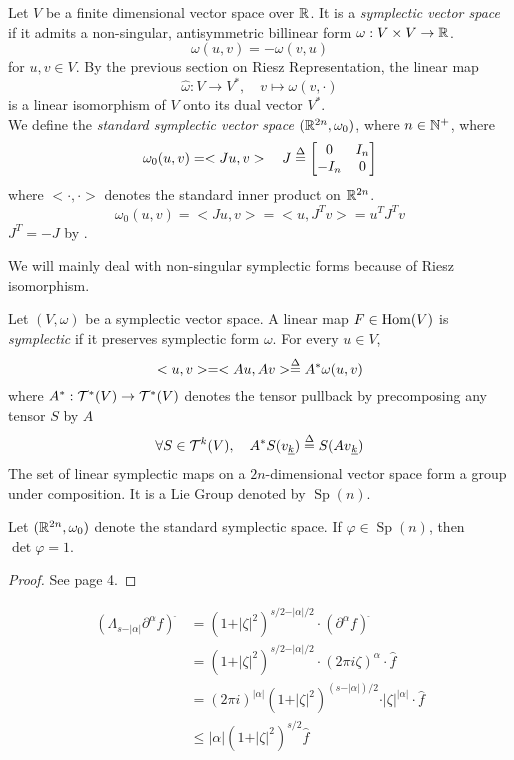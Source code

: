 \documentclass[../main-manifolds.tex]{subfiles}
\begin{document}
\begin{definition}
    Let $V$ be a finite dimensional vector space over $\mathbb{R}$. It is a \emph{symplectic vector space} if it admits a non-singular, antisymmetric billinear form $\omega: V\times V\to \mathbb{R}$.
    \[
        \omega(u,v) = -\omega(v,u)
    \]
    for $u,v\in V$. By the previous section on Riesz Representation, the linear map 
    \[
        \hat{\omega}:V\to V^*,\quad v\mapsto \omega(v,\cdot)
    \]
    is a linear isomorphism of $V$ onto its dual vector $V^*$. \\

    We define the \emph{standard symplectic vector space} $(\mathbb{R}^{2n},\omega_0)$, where $n\in \mathbb{N}^+$, where 
    \[
        \omega_0(u,v) = <Ju, v>\quad J \overset{\Delta}{=}\begin{bmatrix}
            0    & I_n\\ 
            -I_n & 0
        \end{bmatrix}
    \]
    where $<\cdot,\cdot>$ denotes the standard inner product on $\mathbb{R}^{2n}$. 
    \begin{equation}\label{std-symplectic-form}
        \omega_0(u,v) = <Ju,v> = <u, J^Tv> = u^{T}J^T v
    \end{equation}
    $J^T=-J$ by .
\end{definition}
We will mainly deal with non-singular symplectic forms because of Riesz isomorphism.
\begin{definition}
    Let $(V,\omega)$ be a symplectic vector space. A linear map $F\in \Hom[V]$ is \emph{symplectic} if it preserves symplectic form $\omega$. For every $u\in V$, 
    \[
        <u, v> = <Au, Av> \overset{\Delta}{=} A^*\omega(u,v)
    \]
    where $A^*: \mathcal{T}^*(V)\to \mathcal{T}^*(V)$ denotes the tensor pullback by precomposing any tensor $S$ by $A$
    \[
        \forall S\in\Tau^k(V),\quad  A^*S(\Ul{v}[k]) \defined S(\Ul{Av}[k])
    \]
    The set of linear symplectic maps on a $2n$-dimensional vector space form a group under composition. It is a Lie Group denoted by $\operatorname{Sp}(n)$.
\end{definition}
\begin{wts}
    Let $(\mathbb{R}^{2n},\omega_0)$ denote the standard symplectic space. If $\varphi\in \operatorname{Sp}(n)$, then $\det \varphi = 1$. 
\end{wts}
\begin{proof}
    See page 4.    
\end{proof}

\begin{align}
(\Lambda_{s-\vert\alpha\vert}\partial^\alpha f)^{\hat{\:}} &= (1+\vert\zeta\vert^2)^{s/2 - \vert\alpha\vert/2}\cdot(\partial^\alpha f)^{\hat{\:}}\\
&= (1+\vert\zeta\vert^2)^{s/2 - \vert\alpha\vert/2}\cdot(2\pi i \zeta)^{\alpha}
\cdot \hat{f}\\
&= (2\pi i)^{\vert\alpha\vert}(1+\vert\zeta\vert^2)^{(s-\vert\alpha\vert)/2}\cdot\vert\zeta\vert^{\vert\alpha\vert}\cdot\hat{f}\\
&\leq{\vert\alpha\vert}(1+\vert\zeta\vert^2)^{s/2}\hat{f}
\end{align}
\end{document}
